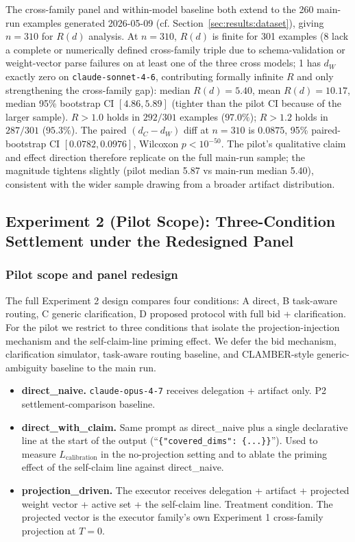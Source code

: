 The cross-family panel and within-model baseline both extend to the 260 main-run examples generated 2026-05-09 (cf. Section~\ref{sec:results:dataset}), giving $n = 310$ for $R(d)$ analysis. At $n = 310$, $R(d)$ is finite for 301 examples (8 lack a complete or numerically defined cross-family triple due to schema-validation or weight-vector parse failures on at least one of the three cross models; 1 has $d_W$ exactly zero on \texttt{claude-sonnet-4-6}, contributing formally infinite $R$ and only strengthening the cross-family gap): median $R(d) = 5.40$, mean $R(d) = 10.17$, median 95\% bootstrap CI $[4.86, 5.89]$ (tighter than the pilot CI because of the larger sample). $R > 1.0$ holds in $292/301$ examples ($97.0\%$); $R > 1.2$ holds in $287/301$ ($95.3\%$). The paired $(d_C - d_W)$ diff at $n = 310$ is $0.0875$, 95\% paired-bootstrap CI $[0.0782, 0.0976]$, Wilcoxon $p < 10^{-50}$. The pilot's qualitative claim and effect direction therefore replicate on the full main-run sample; the magnitude tightens slightly (pilot median 5.87 vs main-run median 5.40), consistent with the wider sample drawing from a broader artifact distribution.


\subsection{Experiment 2 (Pilot Scope): Three-Condition Settlement under the Redesigned Panel}
\label{sec:results:exp2}

\subsubsection{Pilot scope and panel redesign}
\label{sec:results:exp2:scope}

The full Experiment 2 design compares four conditions: A direct, B task-aware routing, C generic clarification, D proposed protocol with full bid + clarification. For the pilot we restrict to three conditions that isolate the projection-injection mechanism and the self-claim-line priming effect. We defer the bid mechanism, clarification simulator, task-aware routing baseline, and CLAMBER-style generic-ambiguity baseline to the main run.

\begin{itemize}
    \item \textbf{direct\_naive.} \texttt{claude-opus-4-7} receives delegation + artifact only. P2 settlement-comparison baseline.
    \item \textbf{direct\_with\_claim.} Same prompt as direct\_naive plus a single declarative line at the start of the output (``\texttt{\{"covered\_dims": \{...\}\}}''). Used to measure $L_{\text{calibration}}$ in the no-projection setting and to ablate the priming effect of the self-claim line against direct\_naive.
    \item \textbf{projection\_driven.} The executor receives delegation + artifact + projected weight vector + active set + the self-claim line. Treatment condition. The projected vector is the executor family's own Experiment 1 cross-family projection at $T = 0$.
\end{itemize}

